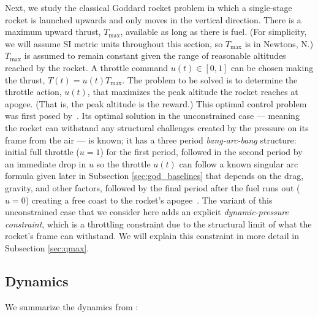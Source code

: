 \documentclass[mnsc,sglanonrev]{informs4}
\begin{document}
Next, we study the classical Goddard rocket problem in which a single-stage rocket is launched upwards and only moves in the vertical direction. There is a maximum upward thrust, $T_{\max}$, available as long as there is fuel. (For simplicity, we will assume SI metric units throughout this section, so $T_{\max}$ is in Newtons, N.) $T_{\max}$ is assumed to remain constant given the range of reasonable altitudes reached by the rocket. A throttle command $u(t) \in [0,1]$ can be chosen making the thrust, $T(t)=u(t)T_{\max}$. The problem to be solved is to determine the throttle action, $u(t)$, that maximizes the peak altitude the rocket reaches at apogee. (That is, the peak altitude is the reward.) This optimal control problem was first posed by~\cite{goddard1919}. Its optimal solution in the unconstrained case --- meaning the rocket can withstand any structural challenges created by the pressure on its frame from the air --- is known; it has a three period \emph{bang-arc-bang} structure: initial full throttle ($u=1$) for the first period, followed in the second period by an immediate drop in $u$ so the throttle $u(t)$ can follow a known singular arc formula given later in Subsection \ref{sec:god_baselines} that depends on the drag, gravity, and other factors, followed by the final period after the fuel runs out ($u=0$) creating a free coast to the rocket's apogee~\citep{tsiotras1991, bryson1999}. The variant of this unconstrained case that we consider here adds an explicit \emph{dynamic-pressure constraint}, which is a throttling constraint due to the structural limit of what the rocket's frame can withstand. We will explain this constraint in more detail in Subsection \ref{sec:qmax}. 


\subsection{Dynamics}
\label{sec:god_dynamics}

We summarize the dynamics from \citet{goddard1919}:
\end{document}
